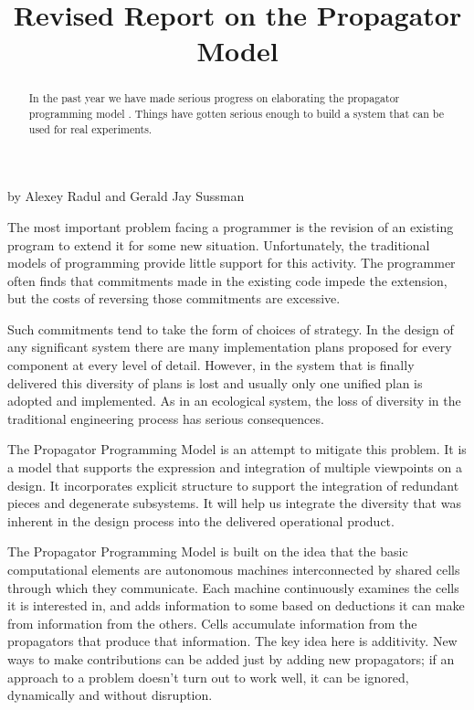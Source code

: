 \documentclass[12pt,letterpaper,english]{article}
\title{Revised Report on the Propagator Model}
\author{}
\date{}
\newlength{\locallinewidth}
\begin{document}
\maketitle

\setlength{\locallinewidth}{\linewidth}
\begin{center}
by Alexey Radul and Gerald Jay Sussman
\end{center}

\begin{abstract}
In the past year we have made serious progress
on elaborating the propagator programming model
\cite{art-thesis, art}.  Things have gotten serious enough to
build a system that can be used for real
experiments.
\end{abstract}

The most important problem facing a programmer is the revision
of an existing program to extend it for some new situation.
Unfortunately, the traditional models of programming provide little
support for this activity.  The programmer often finds that
commitments made in the existing code impede the extension, but the
costs of reversing those commitments are excessive.

Such commitments tend to take the form of choices of strategy.  In the
design of any significant system there are many implementation plans
proposed for every component at every level of detail.  However, in
the system that is finally delivered this diversity of plans is lost
and usually only one unified plan is adopted and implemented.  As in
an ecological system, the loss of diversity in the traditional
engineering process has serious consequences.

The Propagator Programming Model is an attempt to mitigate this
problem.  It is a model that supports the expression and integration
of multiple viewpoints on a design.  It incorporates explicit
structure to support the integration of redundant pieces and
degenerate subsystems.  It will help us integrate the diversity that
was inherent in the design process into the delivered operational
product.

The Propagator Programming Model is built on the idea that the basic
computational elements are autonomous machines interconnected by
shared cells through which they communicate.  Each machine
continuously examines the cells it is interested in, and adds
information to some based on deductions it can make from information
from the others.  Cells accumulate information from the propagators
that produce that information.  The key idea here is additivity.  New
ways to make contributions can be added just by adding new
propagators; if an approach to a problem doesn't turn out to work
well, it can be ignored, dynamically and without disruption.
\end{document}
